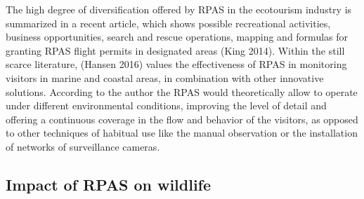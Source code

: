 \documentclass[]{interact}
\theoremstyle{plain}%
\theoremstyle{definition}
\theoremstyle{remark}
\begin{document}
The high degree of diversification offered by RPAS in the ecotourism
industry is summarized in a recent article, which shows possible
recreational activities, business opportunities, search and rescue
operations, mapping and formulas for granting RPAS flight permits in
designated areas (King 2014). Within the still scarce literature,
(Hansen 2016) values the effectiveness of RPAS in monitoring visitors in
marine and coastal areas, in combination with other innovative
solutions. According to the author the RPAS would theoretically allow to
operate under different environmental conditions, improving the level of
detail and offering a continuous coverage in the flow and behavior of
the visitors, as opposed to other techniques of habitual use like the
manual observation or the installation of networks of surveillance
cameras.

\subsection{Impact of RPAS on
wildlife}\label{impact-of-rpas-on-wildlife}
\end{document}
